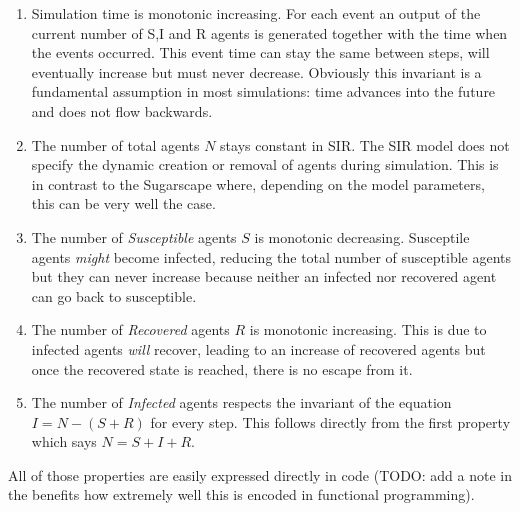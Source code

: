\begin{enumerate}
	\item Simulation time is monotonic increasing. For each event an output of the current number of S,I and R agents is generated together with the time when the events occurred. This event time can stay the same between steps, will eventually increase but must never decrease. Obviously this invariant is a fundamental assumption in most simulations: time advances into the future and does not flow backwards.
	
	\item The number of total agents $N$ stays constant in SIR. The SIR model does not specify the dynamic creation or removal of agents during simulation. This is in contrast to the Sugarscape where, depending on the model parameters, this can be very well the case.
	
	\item The number of \textit{Susceptible} agents $S$ is monotonic decreasing. Susceptile agents \textit{might} become infected, reducing the total number of susceptible agents but they can never increase because neither an infected nor recovered agent can go back to susceptible.
	
	\item The number of \textit{Recovered} agents $R$ is monotonic increasing. This is due to infected agents \textit{will} recover, leading to an increase of recovered agents but once the recovered state is reached, there is no escape from it.
	
	\item The number of \textit{Infected} agents respects the invariant of the equation $I = N - (S + R)$ for every step. This follows directly from the first property which says $N = S + I + R$.
\end{enumerate}

All of those properties are easily expressed directly in code (TODO: add a note in the benefits how extremely well this is encoded in functional programming).


